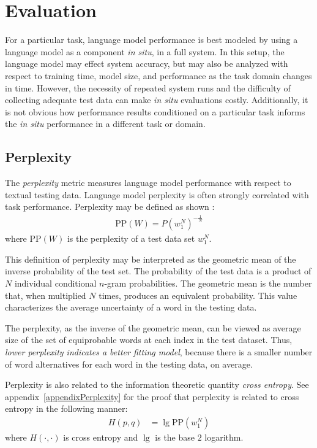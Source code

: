 \documentclass[10pt]{article}
\newcommand{\ngram}{$n$-gram\xspace}
\newcommand{\prb}[1]{P\left(#1\right)}
\begin{document}
\section{Evaluation}
For a particular task, language model performance is best modeled by using a language model as a component \emph{in situ}, in a full system.
In this setup, the language model may effect system accuracy, but may also be analyzed with respect to training time, model size, and performance as the task domain changes in time.
However, the necessity of repeated system runs and the difficulty of collecting adequate test data can make \emph{in situ} evaluations costly. 
Additionally, it is not obvious how performance results conditioned on a particular task informs the \emph{in situ} performance in a different task or domain.


\subsection{Perplexity}

The \emph{perplexity} metric measures language model performance with respect to textual testing data.
Language model perplexity is often strongly correlated with task performance.
Perplexity may be defined as shown \cite{jurafsky2008speech}:
\begin{align}
\text{PP}(W) = \prb{w_1^N}^{- \frac{1}{N}}
\end{align}
where $\text{PP}(W)$ is the perplexity of a test data set $w_1^N$.

This definition of perplexity may be interpreted as the geometric mean of the inverse probability of the test set.
The probability of the test data is a product of $N$ individual conditional \ngram probabilities.
The geometric mean is the number that, when multiplied $N$ times, produces an equivalent probability.
This value characterizes the average uncertainty of a word in the testing data.

The perplexity, as the inverse of the geometric mean, can be viewed as average size of the set of equiprobable words at each index in the test dataset.
Thus, \emph{lower perplexity indicates a better fitting model}, because there is a smaller number of word alternatives for each word in the testing data, on average.

Perplexity is also related to the information theoretic quantity \emph{cross entropy}.
See appendix~\ref{appendixPerplexity} for the proof that perplexity is related to cross entropy in the following manner:
\begin{align}
H(p,q) &= \lg \text{PP}(w_1^N) \label{equCrossEntropyPerplexity}
\end{align}
where $H(\cdot,\cdot)$ is cross entropy and $\lg$ is the base $2$ logarithm. 
\end{document}
